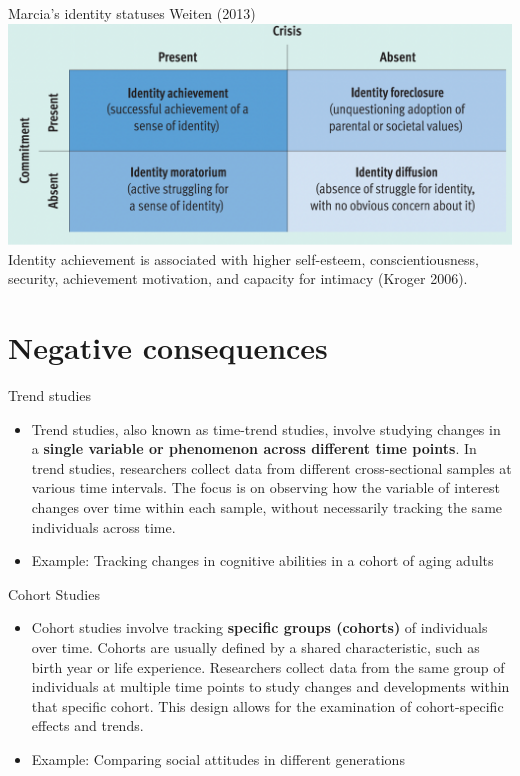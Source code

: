 \documentclass[
  ignorenonframetext,
  aspectratio=169,
]{beamer}
\providecommand{\tightlist}{%
  \setlength{\itemsep}{0pt}\setlength{\parskip}{0pt}}\usepackage{longtable,booktabs,array}
\begin{document}
\begin{frame}{Marcia's identity statuses}
\label{marcias-identity-statuses}
Weiten (2013) \includegraphics{figs/marcia.png} Identity achievement is
associated with higher self-esteem, conscientiousness, security,
achievement motivation, and capacity for intimacy (Kroger 2006).
\end{frame}

\section{Negative consequences}\label{negative-consequences}

\begin{frame}{Trend studies}
\label{trend-studies}
\begin{itemize}[<+->]
\tightlist
\item
  Trend studies, also known as time-trend studies, involve studying
  changes in a \textbf{single variable or phenomenon across different
  time points}. In trend studies, researchers collect data from
  different cross-sectional samples at various time intervals. The focus
  is on observing how the variable of interest changes over time within
  each sample, without necessarily tracking the same individuals across
  time.
\item
  Example: Tracking changes in cognitive abilities in a cohort of aging
  adults
\end{itemize}
\end{frame}

\begin{frame}{Cohort Studies}
\label{cohort-studies}
\begin{itemize}[<+->]
\tightlist
\item
  Cohort studies involve tracking \textbf{specific groups (cohorts)} of
  individuals over time. Cohorts are usually defined by a shared
  characteristic, such as birth year or life experience. Researchers
  collect data from the same group of individuals at multiple time
  points to study changes and developments within that specific cohort.
  This design allows for the examination of cohort-specific effects and
  trends.
\item
  Example: Comparing social attitudes in different generations
\end{itemize}
\end{frame}
\end{document}
